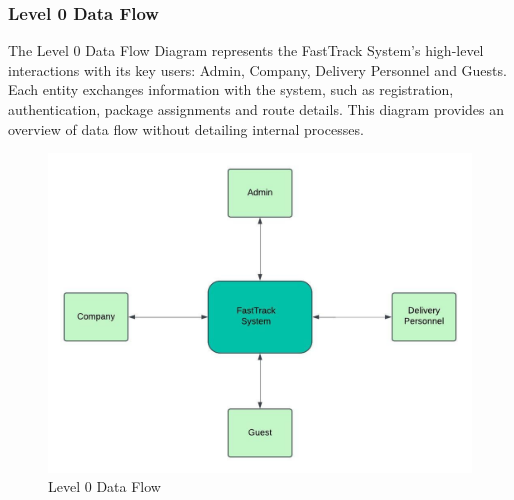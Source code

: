 \subsubsection{Level 0 Data Flow}
The Level 0 Data Flow Diagram represents the FastTrack System's high-level interactions with its key users: Admin, Company, Delivery Personnel and Guests. Each entity exchanges information with the system, such as registration, authentication, package assignments and route details. This diagram provides an overview of data flow without detailing internal processes.
\begin{figure}[H]  %
\centering
    \includegraphics[scale=0.7]{Level 0 Data Flow.jpeg}
    \caption{Level 0 Data Flow}
    \label{fig:level0_data_flow}  %
\end{figure}
\newpage
